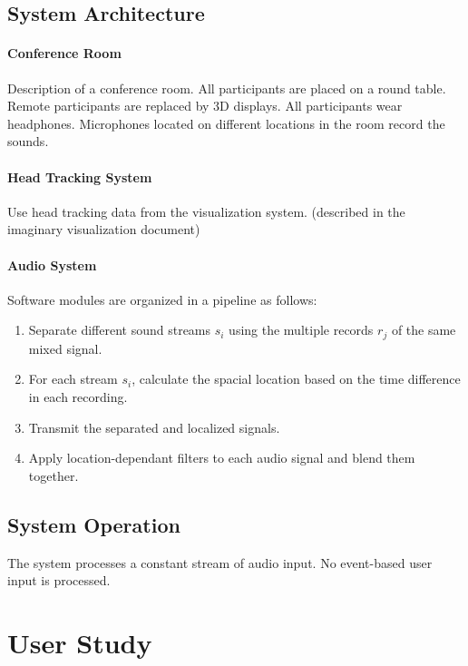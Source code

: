 \documentclass{assign}
\begin{document}
\subsection{System Architecture}

\paragraph{Conference Room}
Description of a conference room. All participants are placed on a round table.
Remote participants are replaced by 3D displays. All participants wear
headphones. Microphones located on different locations in the room record the
sounds.

\paragraph{Head Tracking System}

Use head tracking data from the visualization system. (described in the
imaginary visualization document)

\paragraph{Audio System}

Software modules are organized in a pipeline as follows:
\begin{enumerate}
  \item Separate different sound streams $s_i$ using the multiple records $r_j$
  of the same mixed signal.
  \item For each stream $s_i$, calculate the spacial location based on the time
  difference in each recording.
  \item Transmit the separated and localized signals.
  \item Apply location-dependant filters to each audio signal and blend them
  together.
\end{enumerate}

\subsection{System Operation}

The system processes a constant stream of audio input. No event-based user input
is processed.

\section{User Study}
\end{document}
